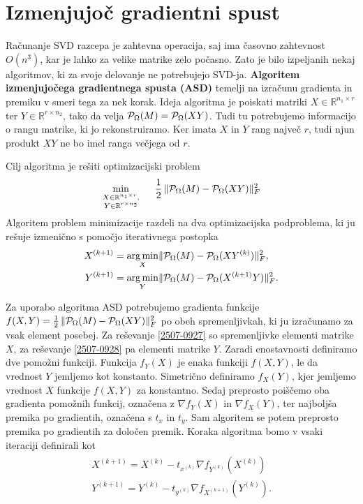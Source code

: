 \section{Izmenjujoč gradientni spust} \label{2707-1337}
Računanje SVD razcepa je zahtevna operacija, saj ima časovno zahtevnost
$O(n^3)$, kar je lahko za velike matrike zelo počasno. Zato je bilo izpeljanih nekaj algoritmov, ki za svoje delovanje ne potrebujejo SVD-ja. \textbf{Algoritem izmenjujočega gradientnega spusta (ASD)} \cite{AST-TK15} 
temelji na izračunu gradienta in premiku
v smeri tega za nek korak. Ideja algoritma je poiskati matriki $X \in \mathbb{R}^{n_1 \times r}$ ter $Y \in \mathbb{R}^{r \times n_2}$, tako da velja $\mathcal{P}_\Omega(M) = \mathcal{P}_\Omega(XY)$. Tudi tu potrebujemo informacijo o rangu matrike, ki jo rekonstruiramo. Ker imata $X$ in $Y$ rang največ $r$, tudi njun produkt $XY$ ne bo imel ranga večjega od $r$. 

Cilj algoritma je rešiti optimizacijski problem
\[
    \min_{\substack{X\in \mathbb{R}^{n_1 \times r}, \\Y \in \mathbb{R}^{r \times n_2}}} \hspace{0.5cm} \frac{1}{2}\, \lVert\mathcal{P}_\Omega(M) - \mathcal{P}_\Omega(XY)\rVert_F^2
\] 
Algoritem problem minimizacije razdeli na dva optimizacijska podproblema, ki ju rešuje izmenično s pomočjo iterativnega postopka
\begin{align}
\label{2507-0927}
    X^{(k+1)} &= \operatorname*{arg\,min}_{X} \lVert\mathcal{P}_\Omega(M) - \mathcal{P}_\Omega(XY^{(k)})\rVert_F^2, \\
\label{2507-0928}
    Y^{(k+1)} &= \operatorname*{arg\,min}_{Y} \lVert\mathcal{P}_\Omega(M) - \mathcal{P}_\Omega(X^{(k+1)}Y)\rVert_F^2.
\end{align}


Za uporabo algoritma ASD potrebujemo gradienta funkcije $f(X,Y) = \frac{1}{2}\, \lVert\mathcal{P}_\Omega(M) - \mathcal{P}_\Omega(XY)\rVert_F^2$ po obeh spremenljivkah, ki ju izračunamo za vsak element posebej.
Za reševanje \eqref{2507-0927} so spremenljivke elementi matrike $X$,
za reševanje \eqref{2507-0928} pa elementi matrike $Y$. Zaradi enostavnosti definiramo dve pomožni funkciji. Funkcija $f_Y(X)$ je enaka funkciji $f(X, Y)$, le da vrednost $Y$ jemljemo kot konstanto. Simetrično definiramo $f_X(Y)$, kjer jemljemo vrednost $X$ funkcije $f(X, Y)$ za konstantno. Sedaj preprosto poiščemo oba gradienta pomožnih funkcij, označena z $\nabla f_Y(X)$ in $\nabla f_X(Y)$, ter najboljša premika po gradientih, označena s $t_x$ in $t_y$. Sam algoritem se potem preprosto premika po gradientih za določen premik. Koraka algoritma bomo v vsaki iteraciji definirali kot
\begin{align}
    \begin{split} \label{2607-1726}
    X^{(k+1)} = X^{(k)} - t_{x^{(k)}} \nabla f_{Y^{(k)}}(X^{(k)}) \\
    Y^{(k+1)} = Y^{(k)} - t_{y^{(k)}} \nabla f_{X^{(k+1)}}(Y^{(k)}).
    \end{split}
\end{align}

